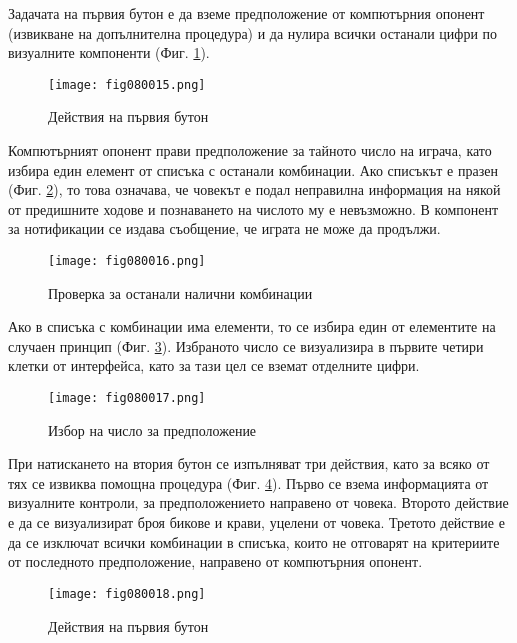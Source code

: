 Задачата на първия бутон е да вземе предположение от компютърния опонент (извикване на допълнителна процедура) и да нулира всички останали цифри по визуалните компоненти (Фиг. \ref{fig080015}).

\begin{figure}[H]
  \centering
  \texttt{[image: fig080015.png]}
  \caption{Действия на първия бутон}
\label{fig080015}
\end{figure}

Компютърният опонент прави предположение за тайното число на играча, като избира един елемент от списъка с останали комбинации. Ако списъкът е празен (Фиг. \ref{fig080016}), то това означава, че човекът е подал неправилна информация на някой от предишните ходове и познаването на числото му е невъзможно. В компонент за нотификации се издава съобщение, че играта не може да продължи. 

\begin{figure}[H]
  \centering
  \texttt{[image: fig080016.png]}
  \caption{Проверка за останали налични комбинации}
\label{fig080016}
\end{figure}

Ако в списъка с комбинации има елементи, то се избира един от елементите на случаен принцип (Фиг. \ref{fig080017}). Избраното число се визуализира в първите четири клетки от интерфейса, като за тази цел се вземат отделните цифри. 

\begin{figure}[H]
  \centering
  \texttt{[image: fig080017.png]}
  \caption{Избор на число за предположение}
\label{fig080017}
\end{figure}

При натискането на втория бутон се изпълняват три действия, като за всяко от тях се извиква помощна процедура (Фиг. \ref{fig080018}). Първо се взема информацията от визуалните контроли, за предположението направено от човека. Второто действие е да се визуализират броя бикове и крави, уцелени от човека. Третото действие е да се изключат всички комбинации в списъка, които не отговарят на критериите от последното предположение, направено от компютърния опонент.

\begin{figure}[H]
  \centering
  \texttt{[image: fig080018.png]}
  \caption{Действия на първия бутон}
\label{fig080018}
\end{figure}

